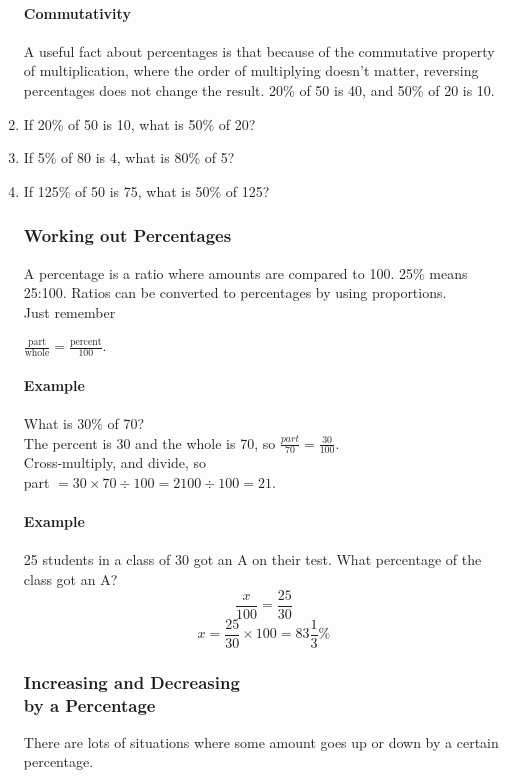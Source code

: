 \documentclass{article}
\begin{document}
\begin{spacing}{1.25}
\begin{enumerate}
\paragraph{Commutativity}
A useful fact about percentages is that because of the commutative property of multiplication, where the order of multiplying doesn't matter, reversing percentages does not change the result. 20\% of 50 is 40, and 50\% of 20 is 10.\\

\item If 20\% of 50 is 10, what is 50\% of 20?
\item If 5\% of 80 is 4, what is 80\% of 5?
\item If 125\% of 50 is 75, what is 50\% of 125?

\subsubsection*{Working out Percentages}
A percentage is a ratio where amounts are compared to 100. 25\% means 25:100. Ratios can be converted to percentages by using proportions.\\

Just remember
\begin{Large}
$\frac{\text{part}}{\text{whole}}=\frac{\text{percent}}{100}$.\\
\end{Large}

\paragraph{Example}
What is 30\% of 70?\\
The percent is 30 and the whole is 70, so $\frac{part}{70}=\frac{30}{100}$.\\
Cross-multiply, and divide, so\\
part $=30\times70\div100=2100\div100=21.$

\paragraph{Example}
25 students in a class of 30 got an A on their test. What percentage of the class got an A?
$$\frac{x}{100}=\frac{25}{30}$$
$$x=\frac{25}{30}\times100 = 83 \frac{1}{3}\%$$

\subsubsection*{Increasing and Decreasing\\ by a Percentage}
There are lots of situations where some amount goes up or down by a certain percentage.


\end{enumerate}
\end{spacing}
\end{document}
